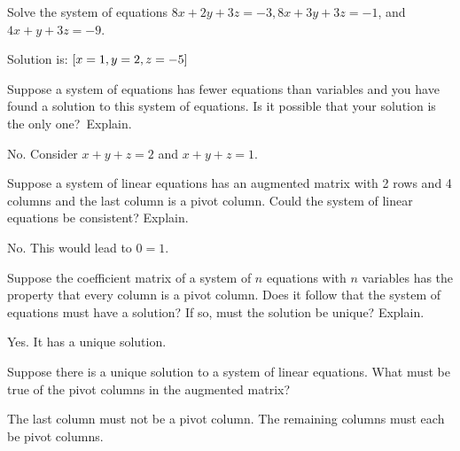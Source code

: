 \begin{ex} Solve the system of equations
$8x+2y+3z=-3,8x+3y+3z=-1$, and $4x+y+3z=-9$.
\begin{sol}
Solution is: $\left[x=1,y=2,z=-5\right] $
\end{sol}
\end{ex}

\begin{ex} Suppose a system of equations has fewer equations than variables and
you have found a solution to this system of equations. Is it possible that
your solution is the only one?\ Explain.
\begin{sol}
No. Consider $x+y+z=2$ and $x+y+z=1$.
\end{sol}
\end{ex}

\begin{ex} Suppose a system of linear equations has an augmented
  matrix with 2 rows and 4 columns and the last column is a pivot
  column. Could the system of linear equations be consistent? Explain.
  \begin{sol}
    No. This would lead to $0=1$.
  \end{sol}
\end{ex}

\begin{ex} Suppose the coefficient matrix of a system of $n$ equations with $n$
variables has the property that every column is a pivot column. Does it
follow that the system of equations must have a solution? If so, must the
solution be unique? Explain.
\begin{sol}
Yes. It has a unique solution.
\end{sol}
\end{ex}

\begin{ex} Suppose there is a unique solution to a system of linear equations.
What must be true of the pivot columns in the augmented matrix?
\begin{sol}
The last column must not be a pivot column. The remaining columns must each be pivot
columns.
\end{sol}
\end{ex}



